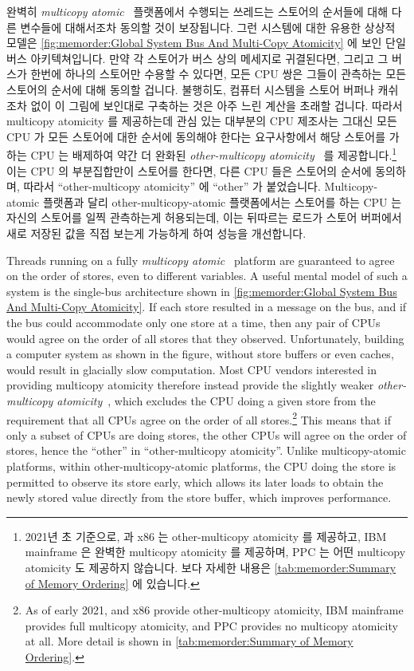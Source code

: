 완벽히 \emph{multicopy atomic}~\cite{Stone:1995:SP:623262.623912} 플랫폼에서
수행되는 쓰레드는 스토어의 순서들에 대해 다른 변수들에 대해서조차 동의할 것이
보장됩니다.
그런 시스템에 대한 유용한 상상적 모델은
\cref{fig:memorder:Global System Bus And Multi-Copy Atomicity}
에 보인 단일 버스 아키텍쳐입니다.
만약 각 스토어가 버스 상의 메세지로 귀결된다면, 그리고 그 버스가 한번에 하나의
스토어만 수용할 수 있다면, 모든 CPU 쌍은 그들이 관측하는 모든 스토어의 순서에
대해 동의할 겁니다.
불행히도, 컴퓨터 시스템을 스토어 버퍼나 캐쉬조차 없이 이 그림에 보인대로
구축하는 것은 아주 느린 계산을 초래할 겁니다.
따라서 multicopy atomicity 를 제공하는데 관심 있는 대부분의 CPU 제조사는 그대신
모든 CPU 가 모든 스토어에 대한 순서에 동의해야 한다는 요구사항에서 해당
스토어를 가하는 CPU 는 배제하여 약간 더 완화된
\emph{other-multicopy atomicity}~\cite[Section B2.3]{ARMv8A:2017} 를
제공합니다.\footnote{
	2021년 초 기준으로,  과 x86 는 other-multicopy atomicity 를
	제공하고, IBM mainframe 은 완벽한 multicopy atomicity 를 제공하며, PPC
	는 어떤 multicopy atomicity 도 제공하지 않습니다.
	보다 자세한 내용은
	\cref{tab:memorder:Summary of Memory Ordering} 에 있습니다.}
이는 CPU 의 부분집합만이 스토어를 한다면, 다른 CPU 들은 스토어의 순서에
동의하며, 따라서 ``other-multicopy atomicity'' 에 ``other'' 가 붙었습니다.
Multicopy-atomic 플랫폼과 달리 other-multicopy-atomic 플랫폼에서는 스토어를
하는 CPU 는 자신의 스토어를 일찍 관측하는게 허용되는데, 이는 뒤따르는 로드가
스토어 버퍼에서 새로 저장된 값을 직접 보는게 가능하게 하여 성능을 개선합니다.

\iffalse

Threads running on a fully
\emph{multicopy atomic}~\cite{Stone:1995:SP:623262.623912}
platform are guaranteed
to agree on the order of stores, even to different variables.
A useful mental model of such a system is the single-bus architecture
shown in
\cref{fig:memorder:Global System Bus And Multi-Copy Atomicity}.
If each store resulted in a message on the bus, and if the bus could
accommodate only one store at a time, then any pair of CPUs would
agree on the order of all stores that they observed.
Unfortunately, building a computer system as shown in the figure, without
store buffers or even caches, would result in glacially slow computation.
Most CPU vendors interested in providing multicopy atomicity therefore
instead provide the slightly weaker
\emph{other-multicopy atomicity}~\cite[Section B2.3]{ARMv8A:2017},
which excludes the CPU doing a given store from the requirement that all
CPUs agree on the order of all stores.\footnote{
	As of early 2021,  and x86 provide other-multicopy atomicity,
	IBM mainframe provides full multicopy atomicity, and PPC
	provides no multicopy atomicity at all.
	More detail is shown in
	\cref{tab:memorder:Summary of Memory Ordering}.}
This means that if only a subset of CPUs are doing stores, the
other CPUs will agree on the order of stores, hence the ``other''
in ``other-multicopy atomicity''.
Unlike multicopy-atomic platforms, within other-multicopy-atomic platforms,
the CPU doing the store is permitted to observe its
store early, which allows its later loads to obtain the newly stored
value directly from the store buffer, which improves performance.

